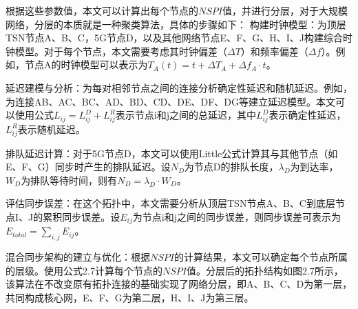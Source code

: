 \documentclass[UTF8,a4paper,12pt]{ctexart}
\numberwithin{equation}{section}
\begin{document}
根据这些参数值，本文可以计算出每个节点的$NSPI$值，并进行分层，对于大规模网络，分层的本质就是一种聚类算法，具体的步骤如下：
构建时钟模型：为顶层TSN节点A、B、C，5G节点D，以及其他网络节点E、F、G、H、I、J构建综合时钟模型。对于每个节点，本文需要考虑其时钟偏差（$\Delta T$）和频率偏差（$\Delta f$）。例如，节点A的时钟模型可以表示为$T_A(t) = t + \Delta T_A + \Delta f_A \cdot t$。

延迟建模与分析：为每对相邻节点之间的连接分析确定性延迟和随机延迟。例如，为连接AB、AC、BC、AD、BD、CD、DE、DF、DG等建立延迟模型。本文可以使用公式$L_{ij} = L_{ij}^D + L_{ij}^R$表示节点i和j之间的总延迟，其中$L_{ij}^D$表示确定性延迟，$L_{ij}^R$表示随机延迟。

排队延迟计算：对于5G节点D，本文可以使用Little公式计算其与其他节点（如E、F、G）同步时产生的排队延迟。设$N_D$为节点D的排队长度，$\lambda_D$为到达率，$W_D$为排队等待时间，则有$N_D = \lambda_D \cdot W_D$。

评估同步误差：在这个拓扑中，本文需要分析从顶层TSN节点A、B、C到底层节点I、J的累积同步误差。设$E_{ij}$为节点i和j之间的同步误差，则同步误差可表示为$E_{total} = \sum_{i,j} E_{ij}$。

混合同步架构的建立与优化：根据$NSPI$的计算结果，本文可以确定每个节点所属的层级。使用公式2.7计算每个节点的$NSPI$值。分层后的拓扑结构如图2.7所示，该算法在不改变原有拓扑连接的基础实现了网络分层，即A、B、C、D为第一层，共同构成核心网，E、F、G为第二层，H、I、J为第三层。
\begin{figure}[H]
\end{figure}
\end{document}
